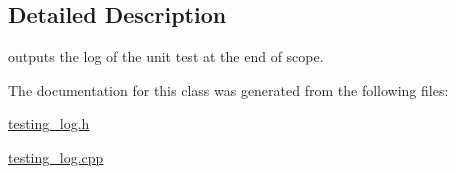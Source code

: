 \subsection{Detailed Description}
outputs the log of the unit test at the end of scope. 

The documentation for this class was generated from the following files\-:\begin{DoxyCompactItemize}
\item 
\hyperlink{testing__log_8h}{testing\-\_\-log.\-h}\item 
\hyperlink{testing__log_8cpp}{testing\-\_\-log.\-cpp}\end{DoxyCompactItemize}
